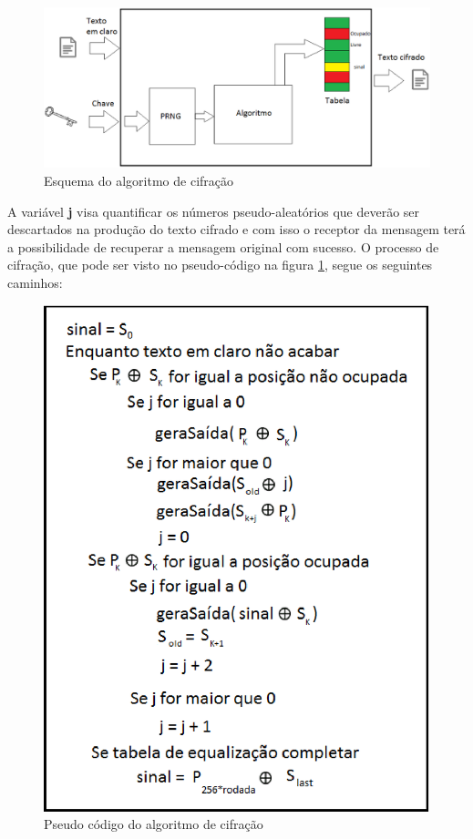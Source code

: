 \begin{figure}[h]
	\centering
	\includegraphics[scale=0.6]{figuras/funcionamento.eps}
	\caption{Esquema do algoritmo de cifração}
\end{figure}

A variável \textbf{j} visa quantificar os números pseudo-aleatórios que deverão ser descartados na produção do texto cifrado e com isso o receptor da mensagem terá a possibilidade de recuperar a mensagem original com sucesso. O processo de cifração, que pode ser visto no pseudo-código na figura \ref{pseudo-codigo}, segue os seguintes caminhos:

\begin{figure}[h]
	\centering
	\includegraphics[scale=1]{figuras/pseudocondigo.eps}
	\caption{Pseudo código do algoritmo de cifração}
	\label{pseudo-codigo}
\end{figure}

